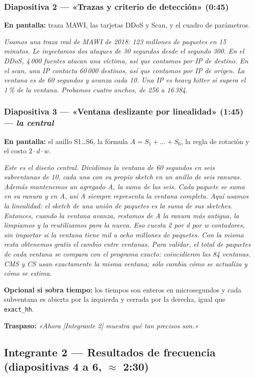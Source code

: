 \documentclass[11pt]{article}
\newcommand{\code}[1]{\texttt{#1}}
\newcommand{\decir}[1]{%
  \par\noindent\colorbox{guion}{\parbox{\dimexpr\linewidth-2\fboxsep}{\small\textit{#1}}}\par\medskip}
\begin{document}
\subsubsection*{Diapositiva 2 — «Trazas y criterio de detección» (0:45)}
\textbf{En pantalla:} traza MAWI, las tarjetas DDoS y Scan, y el cuadro de parámetros.
\decir{Usamos una traza real de MAWI de 2018: 123 millones de paquetes en 15 minutos. Le inyectamos dos ataques de 30 segundos desde el segundo 300. En el DDoS, 4\,000 fuentes atacan una víctima, así que contamos por IP de destino. En el scan, una IP contacta 60\,000 destinos, así que contamos por IP de origen. La ventana es de 60 segundos y avanza cada 10. Una IP es heavy hitter si supera el 1\,\% de la ventana. Probamos cuatro anchos, de 256 a 16\,384.}

\subsubsection*{Diapositiva 3 — «Ventana deslizante por linealidad» (1:45) — \emph{la central}}
\textbf{En pantalla:} el anillo S1…S6, la fórmula $A = S_1 + \dots + S_6$, la regla de rotación y el costo $2\cdot d\cdot w$.
\decir{Este es el diseño central. Dividimos la ventana de 60 segundos en seis subventanas de 10, cada una con su propio sketch en un anillo de seis ranuras. Además mantenemos un agregado A, la suma de las seis. Cada paquete se suma en su ranura y en A, así A siempre representa la ventana completa.
Aquí usamos la linealidad: el sketch de una unión de paquetes es la suma de sus sketches. Entonces, cuando la ventana avanza, restamos de A la ranura más antigua, la limpiamos y la reutilizamos para la nueva. Eso cuesta 2 por d por w contadores, sin importar si la ventana tiene mil u ocho millones de paquetes. Con la misma resta obtenemos gratis el cambio entre ventanas.
Para validar, el total de paquetes de cada ventana se compara con el programa exacto: coincidieron las 84 ventanas. CMS y CS usan exactamente la misma ventana; sólo cambia cómo se actualiza y cómo se estima.}
\textbf{Opcional si sobra tiempo:} los tiempos son enteros en microsegundos y cada subventana es abierta por la izquierda y cerrada por la derecha, igual que \code{exact\_hh}.

\textbf{Traspaso:} \textit{«Ahora [Integrante 2] muestra qué tan precisos son.»}

\subsection{Integrante 2 — Resultados de frecuencia (diapositivas 4 a 6, $\approx$ 2:30)}
\end{document}
